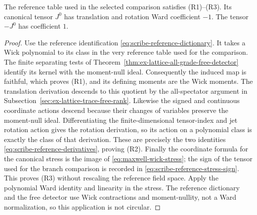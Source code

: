 \begin{corollary}
\label{cor:maxwell-selected-reference-ward}
The reference table used in the selected comparison satisfies
\textup{(R1)--(R3)}. Its canonical tensor $J^0$ has translation and
rotation Ward coefficient $-1$. The tensor $-J^0$ has coefficient $1$.
\end{corollary}
\begin{proof}
Use the reference identification
\eqref{eq:scribe-reference-dictionary}. It takes a Wick polynomial to
its class in the very reference table used for the comparison. The
finite separating tests of
Theorem~\ref{thm:ex-lattice-all-grade-free-detector} identify its kernel
with the moment-null ideal. Consequently the induced map is faithful,
which proves (R1), and its defining moments are the Wick moments.
The translation derivation descends to this quotient by the
all-spectator argument in
Subsection~\ref{sec:ex-lattice-trace-free-rank}. Likewise the signed and
continuous coordinate actions descend because their changes of variables
preserve the moment-null ideal. Differentiating the finite-dimensional tensor-index and jet rotation
action gives the rotation derivation, so its action on a polynomial
class is exactly the class of that derivation. These are precisely the two identities
\eqref{eq:scribe-reference-derivatives}, proving (R2).
Finally the coordinate formula for the canonical stress is the image
of \eqref{eq:maxwell-wick-stress}; the sign of the tensor used for the
branch comparison is recorded in
\eqref{eq:scribe-reference-stress-sign}. This proves (R3) without
rescaling the reference field space. Apply the polynomial Ward identity
and linearity in the stress. The reference dictionary and the free
detector use Wick contractions and moment-nullity, not a Ward
normalization, so this application is not circular.
\end{proof}
